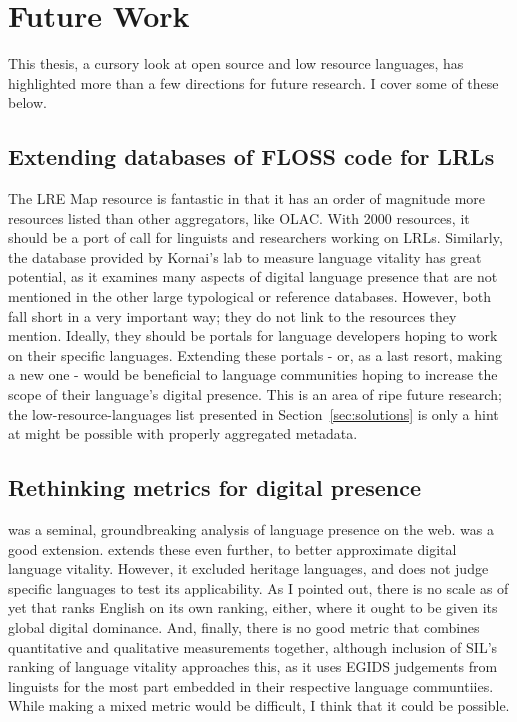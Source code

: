 \section{Future Work}
\label{sec:future-work}

This thesis, a cursory look at open source and low resource languages, has highlighted more than a few directions for future research. I cover some of these below.

\subsection{Extending databases of FLOSS code for LRLs}

The LRE Map resource is fantastic in that it has an order of magnitude more resources listed than other aggregators, like OLAC. With 2000 resources, it should be a port of call for linguists and researchers working on LRLs. Similarly, the database provided by Kornai's lab to measure language vitality has great potential, as it examines many aspects of digital language presence that are not mentioned in the other large typological or reference databases. However, both fall short in a very important way; they do not link to the resources they mention. Ideally, they should be portals for language developers hoping to work on their specific languages. Extending these portals - or, as a last resort, making a new one - would be beneficial to language communities hoping to increase the scope of their language's digital presence. This is an area of ripe future research; the low-resource-languages list presented in Section~\ref{sec:solutions} is only a hint at might be possible with properly aggregated metadata.

\subsection{Rethinking metrics for digital presence}
\citet{kornai2013digital} was a seminal, groundbreaking analysis of language presence on the web. \citet{gibson2016assessing} was a good extension. \citet{soria2017digital} extends these even further, to better approximate digital language vitality. However, it excluded heritage languages, and does not judge specific languages to test its applicability. As I pointed out, there is no scale as of yet that ranks English on its own ranking, either, where it ought to be given its global digital dominance. And, finally, there is no good metric that combines quantitative and qualitative measurements together, although  inclusion of SIL's ranking of language vitality approaches this, as it uses EGIDS judgements from linguists for the most part embedded in their respective language communtiies. While making a mixed metric would be difficult, I think that it could be possible.

